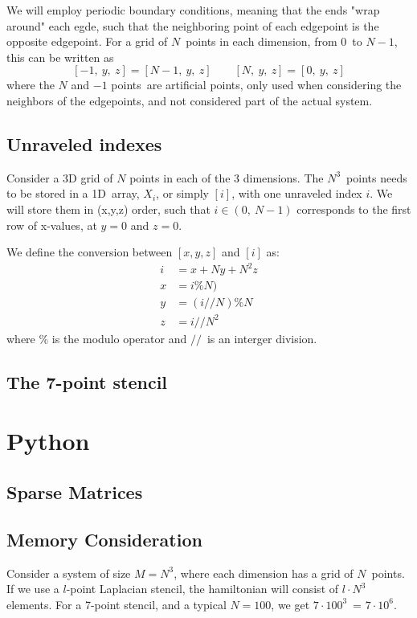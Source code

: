 \documentclass[12p,a4paper]{article}
\begin{document}
We will employ periodic boundary conditions, meaning that the ends "wrap around" each egde, such that the neighboring point of each edgepoint is the opposite edgepoint. For a grid of $N$ points in each dimension, from $0$ to $N-1$, this can be written as
\[
    [-1,\ y,\ z] = [N-1,\ y,\ z] \quad\quad [N,\ y,\ z] = [0,\ y,\ z] 
\]
where the $N$ and $-1$ points are artificial points, only used when considering the neighbors of the edgepoints, and not considered part of the actual system.


\subsection{Unraveled indexes}
Consider a 3D grid of $N$ points in each of the 3 dimensions. The $N^3$ points needs to be stored in a 1D array, $X_i$, or simply $[i]$, with one unraveled index $i$. We will store them in (x,y,z) order, such that $i \in (0,\ N-1)$ corresponds to the first row of x-values, at $y=0$ and $z=0$.

We define the conversion between $[x,y,z]$ and $[i]$ as:
\begin{align*}
    i &= x + Ny + N^2z \\
    x &= i \% N) \\
    y &= (i//N) \% N \\
    z &= i//N^2
\end{align*}
where $\%$ is the modulo operator and $//$ is an interger division.


\subsection{The 7-point stencil}




\newpage
\section{Python}
\subsection{Sparse Matrices}

\subsection{Memory Consideration}
Consider a system of size $M = N^3$, where each dimension has a grid of $N$ points. If we use a $l$-point Laplacian stencil, the hamiltonian will consist of $l\cdot N^3$ elements. For a 7-point stencil, and a typical $N=100$, we get $7\cdot 100^3$ = $7\cdot 10^6$.
\end{document}
